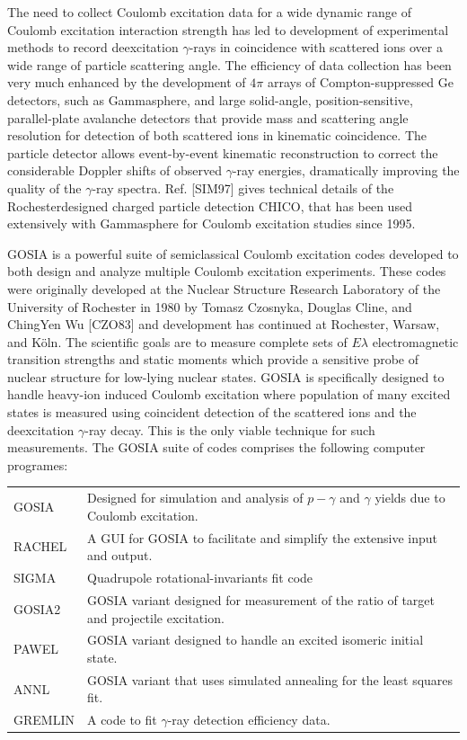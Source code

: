 \documentclass[10pt]{article}
\begin{document}
The need to collect Coulomb excitation data for a wide dynamic range of Coulomb excitation interaction strength has led to development of experimental methods to record deexcitation $\gamma$-rays in coincidence with scattered ions over a wide range of particle scattering angle. The efficiency of data collection has been very much enhanced by the development of $4 \pi$ arrays of Compton-suppressed Ge detectors, such as Gammasphere, and large solid-angle, position-sensitive, parallel-plate avalanche detectors that provide mass and scattering angle resolution for detection of both scattered ions in kinematic coincidence. The particle detector allows event-by-event kinematic reconstruction to correct the considerable Doppler shifts of observed $\gamma$-ray energies, dramatically improving the quality of the $\gamma$-ray spectra. Ref. [SIM97] gives technical details of the Rochesterdesigned charged particle detection CHICO, that has been used extensively with Gammasphere for Coulomb excitation studies since 1995.

GOSIA is a powerful suite of semiclassical Coulomb excitation codes developed to both design and analyze multiple Coulomb excitation experiments. These codes were originally developed at the Nuclear Structure Research Laboratory of the University of Rochester in 1980 by Tomasz Czosnyka, Douglas Cline, and ChingYen Wu [CZO83] and development has continued at Rochester, Warsaw, and Köln. The scientific goals are to measure complete sets of $E \lambda$ electromagnetic transition strengths and static moments which provide a sensitive probe of nuclear structure for low-lying nuclear states. GOSIA is specifically designed to handle heavy-ion induced Coulomb excitation where population of many excited states is measured using coincident detection of the scattered ions and the deexcitation $\gamma$-ray decay. This is the only viable technique for such measurements. The GOSIA suite of codes comprises the following computer programes:

\begin{center}
\begin{tabular}{ll}
GOSIA & Designed for simulation and analysis of $p-\gamma$ and $\gamma$ yields due to Coulomb excitation. \\
RACHEL & A GUI for GOSIA to facilitate and simplify the extensive input and output. \\
SIGMA & Quadrupole rotational-invariants fit code \\
GOSIA2 & GOSIA variant designed for measurement of the ratio of target and projectile excitation. \\
PAWEL & GOSIA variant designed to handle an excited isomeric initial state. \\
ANNL & GOSIA variant that uses simulated annealing for the least squares fit. \\
GREMLIN & A code to fit $\gamma$-ray detection efficiency data. \\
\end{tabular}
\end{center}
\end{document}
